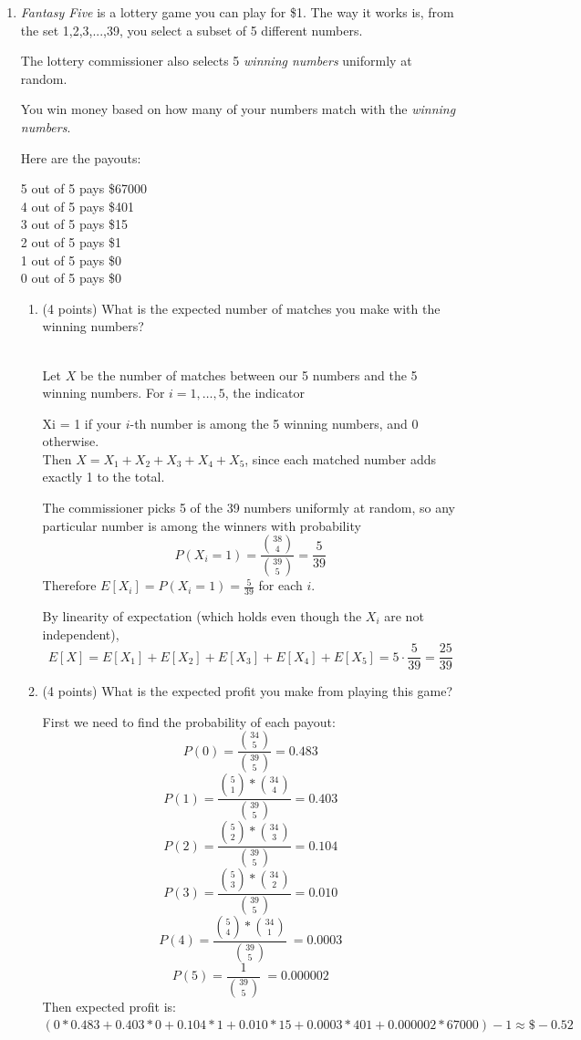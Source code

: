 \documentclass[10pt,letterpaper,unboxed,cm]{article}
\begin{document}
\begin{enumerate}
\begin{enumerate}
\end{enumerate}

\item
\emph{Fantasy Five} is a lottery game you can play for \$1. The way it works is, from the set {1,2,3,...,39}, you select a subset of 5 different numbers.

The lottery commissioner also selects 5 \emph{winning numbers} uniformly at random.

You win money based on how many of your numbers match with the \emph{winning numbers}.

Here are the payouts:

5 out of 5 pays \$67000\\
4 out of 5 pays \$401\\
3 out of 5 pays \$15\\
2 out of 5 pays \$1\\
1 out of 5 pays \$0\\
0 out of 5 pays \$0\\


\begin{enumerate}
\item (4 points)
What is the expected number of matches you make with the winning numbers?

\\

Let $X$ be the number of matches between our 5 numbers and the 5 winning numbers. For $i = 1, \dots, 5$, the indicator

Xi = 1 if your $i$-th number is among the 5 winning numbers, and 0 otherwise.\\
Then $X = X_1 + X_2 + X_3 + X_4 + X_5$, since each matched number adds exactly 1 to the total.

The commissioner picks 5 of the 39 numbers uniformly at random, so any particular number is among the winners with probability
\[P(X_i = 1) = \frac{\binom{38}{4}}{\binom{39}{5}} = \frac{5}{39}\]
Therefore $E[X_i] = P(X_i = 1) = \frac{5}{39}$ for each $i$.

By linearity of expectation (which holds even though the $X_i$ are not independent),
\[E[X] = E[X_1] + E[X_2] + E[X_3] + E[X_4] + E[X_5] = 5 \cdot \frac{5}{39} = \frac{25}{39}\]


\item (4 points)
What is the expected profit you make from playing this game?

\begin{solution}

    First we need to find the probability of each payout:\\
    \[P(0) = \frac{\binom{34}{5}}{\binom{39}{5}} = 0.483\]
    \[P(1) = \frac{\binom{5}{1}*\binom{34}{4}}{\binom{39}{5}} = 0.403\]
    \[P(2) = \frac{\binom{5}{2}*\binom{34}{3}}{\binom{39}{5}} = 0.104\]
    \[P(3) = \frac{\binom{5}{3}*\binom{34}{2}}{\binom{39}{5}} = 0.010\]
    \[P(4) = \frac{\binom{5}{4}*\binom{34}{1}}{\binom{39}{5}}\ = 0.0003\]
    \[P(5) = \frac{1}{\binom{39}{5}}\ = 0.000002\]
    Then expected profit is:
    $(0 * 0.483 + 0.403 * 0 + 0.104 * 1 + 0.010 * 15 + 0.0003 * 401 + 0.000002 * 67000) - 1 \approx \boxed{\mathdollar-0.52}$



\end{solution}
\end{enumerate}
\end{enumerate}
\end{document}
